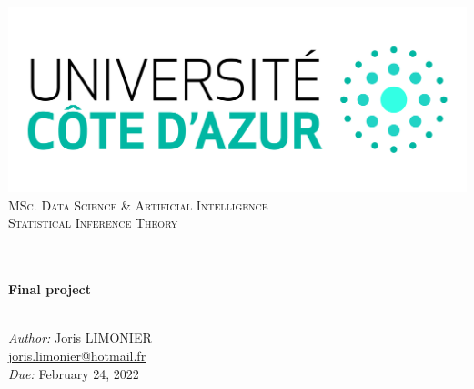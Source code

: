 \begin{titlepage}
	\begin{center}
		\includegraphics[width=\textwidth]{images/logo_uca.jpeg}\\[0.1cm]
		\vspace{1.5cm}
		\textsc{\Large MSc. Data Science \& Artificial Intelligence}\\[1.2cm]
		\textsc{\Large Statistical Inference Theory}\\[1.2cm]
		\\
		\vspace{1cm}

		\HRule \\[0.6cm]
		{\huge \bfseries Final project}\\[0.3cm]
		\HRule \\[1.8cm]
		\vfill

		\large
		\emph{Author:} Joris LIMONIER\\[.2cm]
		\href{mailto:joris.limonier@hotmail.fr}{\color{black}joris.limonier@hotmail.fr} \\[.2cm]
		\emph{Due:} {\large February 24, 2022}
	\end{center}
\end{titlepage}


